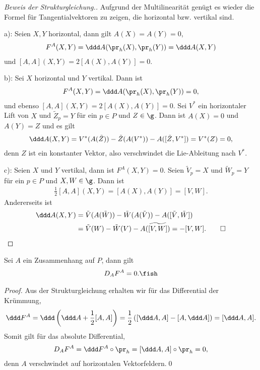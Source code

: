 \documentclass[%
	paper=a5,%
	fleqn,%
	DIV=18,%
	BCOR=0mm,
	fontsize=11pt,
	titlepage=false,%
	bibliography=totoc,
	DIV=18,%
	twoside=true,
	pdftitle=Riemannsche Geometrie,
	pdfauthor=Uwe Semmelmann,
	numbers=noendperiod]%
	{scrbook}
\begin{document}
\begin{proof}[Beweis der Strukturgleichung.]
Aufgrund der Multilinearität genügt es wieder die Formel für Tangentialvektoren
zu zeigen, die horizontal bzw. vertikal sind.

a): Seien $X,Y$ horizontal, dann gilt $A(X) = A(Y) = 0$,
\begin{align*}
F^A(X,Y) = \ddd A(\pr_h(X),\pr_h(Y)) = \ddd
A(X,Y)
\end{align*}
und $[A,A](X,Y) = 2[A(X),A(Y)] =  0$.

b): Sei $X$ horizontal und $Y$ vertikal. Dann ist
\begin{align*}
F^A(X,Y) = \ddd A(\pr_h(X),\pr_h(Y)) = 0,
\end{align*}
und ebenso $[A,A](X,Y) = 2[A(X),A(Y)] = 0$.
Sei $V^*$ ein horizontaler Lift von $X$ und $\tilde{Z}_p = Y$ für ein $p\in P$
und $Z\in\g$. Dann ist $A(X) = 0$ und $A(Y) = Z$ und es gilt
\begin{align*}
\ddd A(X,Y) = V^*(A(\tilde{Z})) - \tilde{Z}(A(V^*)) - A([\tilde{Z},V^*])
= V^*(Z) = 0, 
\end{align*}
denn $Z$ ist ein konstanter Vektor, also verschwindet die Lie-Ableitung nach
$V^*$.

c): Seien $X$ und $Y$ vertikal, dann ist $F^A(X,Y) = 0$. Seien $\tilde{V}_p = X$
und $\tilde{W}_p = Y$ für ein $p\in P$ und $X,W\in\g$. Dann ist
\begin{align*}
\frac{1}{2}[A,A](X,Y) = [A(X),A(Y)] = [V,W].
\end{align*}
Andererseits ist
\begin{align*}
\ddd A(X,Y) &= \tilde{V}(A(\tilde{W})) - \tilde{W}(A(\tilde{V})) -
A([\tilde{V},\tilde{W}])\\
&= \tilde{V}(W) - \tilde{W}(V)
- A(\widetilde{[V,W]})
= -[V,W].\qed 
\end{align*}
\end{proof}



\begin{prop}
Sei $A$ ein Zusammenhang auf $P$, dann gilt
\begin{align*}
D_A F^A = 0.\fish
\end{align*}
\end{prop}

\begin{proof}
Aus der Strukturgleichung erhalten wir für das Differential der Krümmung,
\begin{align*}
\ddd F^A = \ddd\left(\ddd A + \frac{1}{2}[A,A]\right)
= \frac{1}{2}\left([\ddd A,A] - [A,\ddd A] \right)
= [\ddd A,A].
\end{align*}
Somit gilt für das absolute Differential,
\begin{align*}
D_A F^A = \ddd F^A\circ\pr_h = [\ddd A,A]\circ\pr_h = 0, 
\end{align*}
denn $A$ verschwindet auf horizontalen Vektorfeldern.\qed
\end{proof}
\end{document}
